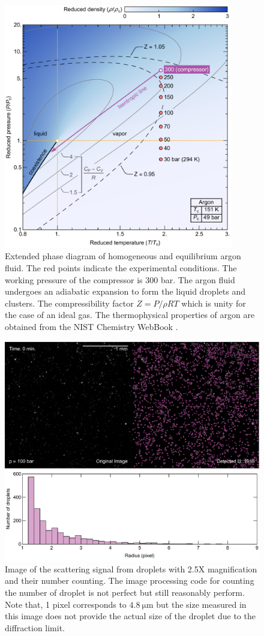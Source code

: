 \begin{figure}[ht!]
\centering
\includegraphics[width=100mm]{figures/ch2/phaseDiag/phaseDiag.pdf}
\caption{Extended phase diagram of homogeneous and equilibrium argon fluid. The red points indicate the experimental conditions. The working pressure of the compressor is 300 bar. The argon fluid undergoes an adiabatic expansion to form the liquid droplets and clusters. The compressibility factor $Z=P/ρRT$ which is unity for the case of an ideal gas. The thermophysical properties of argon are obtained from the NIST Chemistry WebBook \cite{linstorm2020nist}.}
\label{fig:phaseDiag}
\end{figure}

\begin{figure}[ht!]
\centering
\includegraphics[width=130mm]{figures/ch2/droplet/imgProcess.pdf}
\caption{Image of the scattering signal from droplets with 2.5X magnification and their number counting. The image processing code for counting the number of droplet is not perfect but still reasonably perform. Note that, 1 pixel corresponds to $4.8 ~\mathrm{\mu}\text{m}$ but the size measured in this image does not provide the actual size of the droplet due to the diffraction limit.}
\label{fig:imgProcess}
\end{figure}

